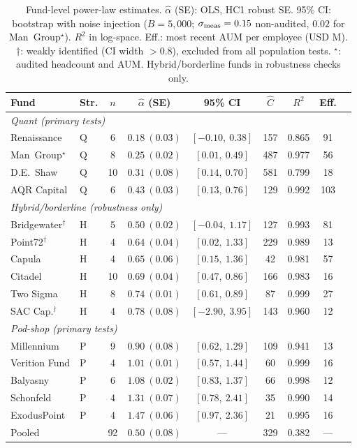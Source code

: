 \documentclass[12pt]{article}
\newcommand{\alphahat}{\hat{\alpha}}
\begin{document}
\begin{table}[htbp]
\caption{\label{tab:params}
  Fund-level power-law estimates.
  $\alphahat$ (SE): OLS, HC1 robust SE.
  95\% CI: bootstrap with noise injection
  ($B{=}5{,}000$; $\sigma_{\rm meas} = 0.15$ non-audited,
  $0.02$ for Man~Group$^\star$).
  $R^2$ in log-space.
  Eff.: most recent AUM per employee (USD M).
  $\dagger$: weakly identified (CI width $> 0.8$), excluded
  from all population tests.
  $^\star$: audited headcount and AUM.
  Hybrid/borderline funds in robustness checks only.
}
\setlength{\tabcolsep}{5pt}
\small
\begin{tabular}{@{}llccccccc@{}}
\toprule
Fund & Str. & $n$ & $\alphahat$ (SE) & 95\% CI
     & $\hat C$ & $R^2$ & Eff. \\
\midrule
\multicolumn{8}{l}{\textit{Quant (primary tests)}} \\
Renaissance       & Q &  6 & $0.18~(0.03)$ & $[-0.10,~0.38]$
  & 157 & 0.865 & 91 \\
Man~Group$^\star$ & Q &  8 & $0.25~(0.02)$ & $[0.01,~0.49]$
  & 487 & 0.977 & 56 \\
D.E.\ Shaw        & Q & 10 & $0.31~(0.08)$ & $[0.14,~0.70]$
  & 581 & 0.799 & 18 \\
AQR Capital       & Q &  6 & $0.43~(0.03)$ & $[0.13,~0.76]$
  & 129 & 0.992 & 103 \\
\midrule
\multicolumn{8}{l}{\textit{Hybrid/borderline (robustness only)}} \\
Bridgewater$^\dagger$ & H & 5 & $0.50~(0.02)$ & $[-0.04,~1.17]$
  & 127 & 0.993 & 81 \\
Point72$^\dagger$     & H & 4 & $0.64~(0.04)$ & $[0.02,~1.33]$
  & 229 & 0.989 & 13 \\
Capula                & H & 4 & $0.65~(0.06)$ & $[0.15,~1.36]$
  &  42 & 0.981 & 57 \\
Citadel               & H &10 & $0.69~(0.04)$ & $[0.47,~0.86]$
  & 166 & 0.983 & 16 \\
Two Sigma             & H & 8 & $0.74~(0.01)$ & $[0.61,~0.89]$
  &  87 & 0.999 & 27 \\
SAC Cap.$^\dagger$    & H & 4 & $0.78~(0.08)$ & $[-2.90,~3.95]$
  & 143 & 0.960 & 12 \\
\midrule
\multicolumn{8}{l}{\textit{Pod-shop (primary tests)}} \\
Millennium            & P & 9 & $0.90~(0.08)$ & $[0.62,~1.29]$
  & 109 & 0.941 & 13 \\
Verition Fund         & P & 4 & $1.01~(0.01)$ & $[0.57,~1.44]$
  &  60 & 0.999 & 16 \\
Balyasny              & P & 6 & $1.08~(0.02)$ & $[0.83,~1.37]$
  &  66 & 0.998 & 12 \\
Schonfeld             & P & 4 & $1.31~(0.07)$ & $[0.78,~2.41]$
  &  35 & 0.990 & 14 \\
ExodusPoint           & P & 4 & $1.47~(0.06)$ & $[0.97,~2.36]$
  &  21 & 0.995 & 16 \\
\midrule
Pooled                &   &92 & $0.50~(0.08)$ & ---
  & 329 & 0.382 & --- \\
\bottomrule
\end{tabular}
\end{table}
\end{document}
